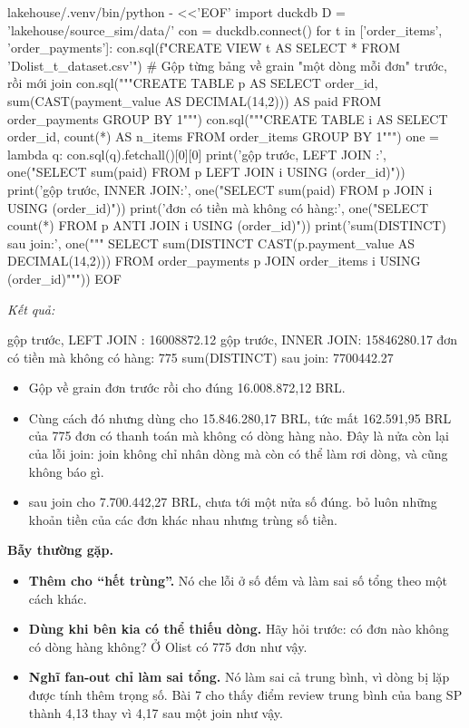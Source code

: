 \begin{codeblock}
lakehouse/.venv/bin/python - <<'EOF'
import duckdb
D = 'lakehouse/source_sim/data/'
con = duckdb.connect()
for t in ['order_items', 'order_payments']:
    con.sql(f"CREATE VIEW {t} AS SELECT * FROM '{D}olist_{t}_dataset.csv'")
# Gộp từng bảng về grain "một dòng mỗi đơn" trước, rồi mới join
con.sql("""CREATE TABLE p AS SELECT order_id,
             sum(CAST(payment_value AS DECIMAL(14,2))) AS paid
           FROM order_payments GROUP BY 1""")
con.sql("""CREATE TABLE i AS SELECT order_id, count(*) AS n_items
           FROM order_items GROUP BY 1""")
one = lambda q: con.sql(q).fetchall()[0][0]
print('gộp trước, LEFT JOIN :',
      one("SELECT sum(paid) FROM p LEFT JOIN i USING (order_id)"))
print('gộp trước, INNER JOIN:',
      one("SELECT sum(paid) FROM p JOIN i USING (order_id)"))
print('đơn có tiền mà không có hàng:',
      one("SELECT count(*) FROM p ANTI JOIN i USING (order_id)"))
print('sum(DISTINCT) sau join:', one("""
  SELECT sum(DISTINCT CAST(p.payment_value AS DECIMAL(14,2)))
  FROM order_payments p JOIN order_items i USING (order_id)"""))
EOF
\end{codeblock}
\textit{Kết quả:}
\begin{codeblock}
gộp trước, LEFT JOIN : 16008872.12
gộp trước, INNER JOIN: 15846280.17
đơn có tiền mà không có hàng: 775
sum(DISTINCT) sau join: 7700442.27
\end{codeblock}

\begin{itemize}
  \item Gộp về grain đơn trước rồi  cho đúng 16.008.872,12 BRL.
  \item Cùng cách đó nhưng dùng  cho 15.846.280,17 BRL, tức mất 162.591,95 BRL của 775 đơn có thanh toán mà không có dòng hàng nào. Đây là nửa còn lại của lỗi join: join không chỉ nhân dòng mà còn có thể làm rơi dòng, và cũng không báo gì.
  \item {} sau join cho 7.700.442,27 BRL, chưa tới một nửa số đúng.  bỏ luôn những khoản tiền của các đơn khác nhau nhưng trùng số tiền.
\end{itemize}

\begin{luuy}
\textbf{Bẫy thường gặp.}
\begin{itemize}
  \item \textbf{Thêm  cho ``hết trùng''.} Nó che lỗi ở số đếm và làm sai số tổng theo một cách khác.
  \item \textbf{Dùng  khi bên kia có thể thiếu dòng.} Hãy hỏi trước: có đơn nào không có dòng hàng không? Ở Olist có 775 đơn như vậy.
  \item \textbf{Nghĩ fan-out chỉ làm sai tổng.} Nó làm sai cả trung bình, vì dòng bị lặp được tính thêm trọng số. Bài 7 cho thấy điểm review trung bình của bang SP thành 4,13 thay vì 4,17 sau một join như vậy.
\end{itemize}
\end{luuy}

